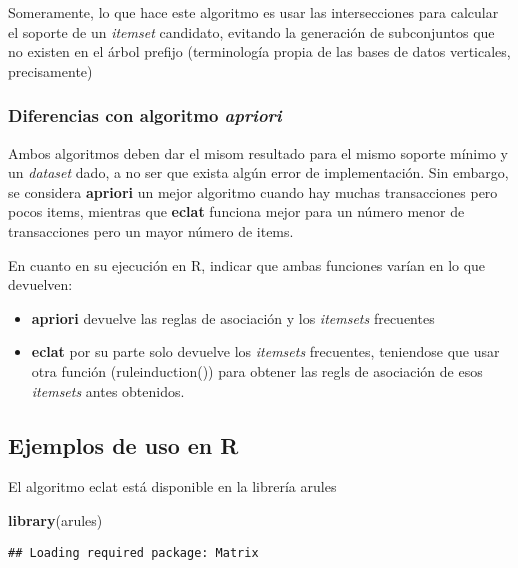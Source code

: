 \documentclass[]{article}
\newenvironment{Shaded}{\begin{snugshade}}{\end{snugshade}}
\newcommand{\KeywordTok}[1]{\textcolor[rgb]{0.13,0.29,0.53}{\textbf{#1}}}
\newcommand{\NormalTok}[1]{#1}
\providecommand{\tightlist}{%
  \setlength{\itemsep}{0pt}\setlength{\parskip}{0pt}}
\begin{document}
Someramente, lo que hace este algoritmo es usar las intersecciones para
calcular el soporte de un \emph{itemset} candidato, evitando la
generación de subconjuntos que no existen en el árbol prefijo
(terminología propia de las bases de datos verticales, precisamente)

\subsubsection{\texorpdfstring{Diferencias con algoritmo
\emph{apriori}}{Diferencias con algoritmo apriori}}\label{diferencias-con-algoritmo-apriori}

Ambos algoritmos deben dar el misom resultado para el mismo soporte
mínimo y un \emph{dataset} dado, a no ser que exista algún error de
implementación. Sin embargo, se considera \textbf{apriori} un mejor
algoritmo cuando hay muchas transacciones pero pocos items, mientras que
\textbf{eclat} funciona mejor para un número menor de transacciones pero
un mayor número de items.

En cuanto en su ejecución en R, indicar que ambas funciones varían en lo
que devuelven:

\begin{itemize}
\tightlist
\item
  \textbf{apriori} devuelve las reglas de asociación y los
  \emph{itemsets} frecuentes
\item
  \textbf{eclat} por su parte solo devuelve los \emph{itemsets}
  frecuentes, teniendose que usar otra función (ruleinduction()) para
  obtener las regls de asociación de esos \emph{itemsets} antes
  obtenidos.
\end{itemize}

\subsection{Ejemplos de uso en R}\label{ejemplos-de-uso-en-r}

El algoritmo eclat está disponible en la librería arules

\begin{Shaded}
\begin{Highlighting}[]
\KeywordTok{library}\NormalTok{(arules)}
\end{Highlighting}
\end{Shaded}

\begin{verbatim}
## Loading required package: Matrix
\end{verbatim}
\end{document}
